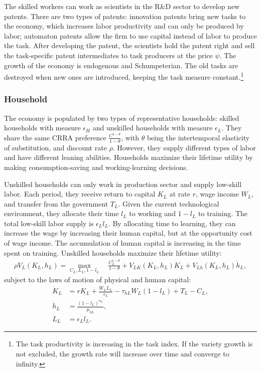 \documentclass[12pt]{article}
\begin{document}
The skilled workers can work as scientists in the R\&D sector to develop new patents. There are two types of patents: innovation patents bring new tasks to the economy, which increases labor productivity and can only be produced by labor; automaton patents allow the firm to use capital instead of labor to produce the task. After developing the patent, the scientists hold the patent right and sell the task-specific patent intermediates to task producers at the price $\psi$. The growth of the economy is endogenous and Schumpeterian. The old tasks are destroyed when new ones are introduced, keeping the task measure constant.\footnote{The task productivity is increasing in the task index. If the variety growth is not excluded, the growth rate will increase over time and converge to infinity.} 

\subsubsection*{Household}
The economy is populated by two types of representative households: skilled households with measure $\epsilon_H$ and unskilled households with measure $\epsilon_L$. They share the same CRRA preference $\frac{C^{1-\theta}}{1-\theta}$, with $\theta$ being the intertemporal elasticity of substitution, and discount rate $\rho$. However, they supply different types of labor and have different leaning abilities. Households maximize their lifetime utility by making consumption-saving and working-learning decisions. 

Unskilled households can only work in production sector and supply low-skill labor. Each period, they receive return to capital $K_L$ at rate $r$, wage income $W_L$, and transfer from the government $T_L$. Given the current technological environment, they allocate their time $l_L$ to working and $1-l_L$ to training. The total low-skill labor supply is $\epsilon_Ll_L$. By allocating time to learning, they can increase the wage by increasing their human capital, but at the opportunity cost of wage income. The accumulation of human capital is increasing in the time spent on training. Unskilled households maximize their lifetime utility: 
\begin{align*}
\rho V_L(K_L,h_L) = \max_{C_L,L_L,1-l_L} \quad \frac{C_L^{1-\theta}}{1-\theta}+V_{LK}(K_L,h_L)\dot{K}_L+V_{Lh}(K_L,h_L)\dot{h}_L,
\end{align*}
subject to the laws of motion of physical and human capital: 
\begin{align*}
\dot{K}_L &=r K_L+\frac{W_LL_L}{\epsilon_L}-\tau_{hL}W_L(1-l_L)+T_L-C_L, \\
\dot{h}_L &= \frac{(1-l_L)^{\alpha_L}}{\mu_{hL}}, \\
L_L &=\epsilon_L l_L.
\end{align*}
\end{document}
